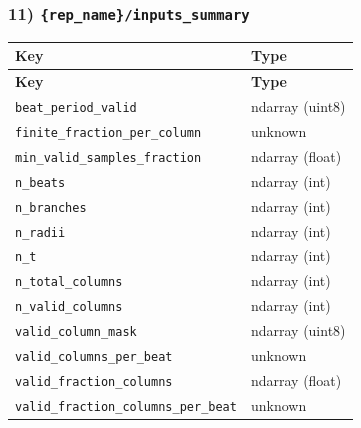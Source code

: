 \documentclass[11pt]{article}
\begin{document}
\subsubsection*{11) \texttt{\{rep\_\allowbreak{}name\}/\allowbreak{}inputs\_\allowbreak{}summary}}
\begin{longtable}{|p{}|p{}|}
\hline
\textbf{Key} & \textbf{Type} \\ \hline
\endfirsthead
\hline
\textbf{Key} & \textbf{Type} \\ \hline
\endhead
\texttt{beat\_\allowbreak{}period\_\allowbreak{}valid} & ndarray (uint8) \\ \hline
\texttt{finite\_\allowbreak{}fraction\_\allowbreak{}per\_\allowbreak{}column} & unknown \\ \hline
\texttt{min\_\allowbreak{}valid\_\allowbreak{}samples\_\allowbreak{}fraction} & ndarray (float) \\ \hline
\texttt{n\_\allowbreak{}beats} & ndarray (int) \\ \hline
\texttt{n\_\allowbreak{}branches} & ndarray (int) \\ \hline
\texttt{n\_\allowbreak{}radii} & ndarray (int) \\ \hline
\texttt{n\_\allowbreak{}t} & ndarray (int) \\ \hline
\texttt{n\_\allowbreak{}total\_\allowbreak{}columns} & ndarray (int) \\ \hline
\texttt{n\_\allowbreak{}valid\_\allowbreak{}columns} & ndarray (int) \\ \hline
\texttt{valid\_\allowbreak{}column\_\allowbreak{}mask} & ndarray (uint8) \\ \hline
\texttt{valid\_\allowbreak{}columns\_\allowbreak{}per\_\allowbreak{}beat} & unknown \\ \hline
\texttt{valid\_\allowbreak{}fraction\_\allowbreak{}columns} & ndarray (float) \\ \hline
\texttt{valid\_\allowbreak{}fraction\_\allowbreak{}columns\_\allowbreak{}per\_\allowbreak{}beat} & unknown \\ \hline
\end{longtable}
\end{document}
